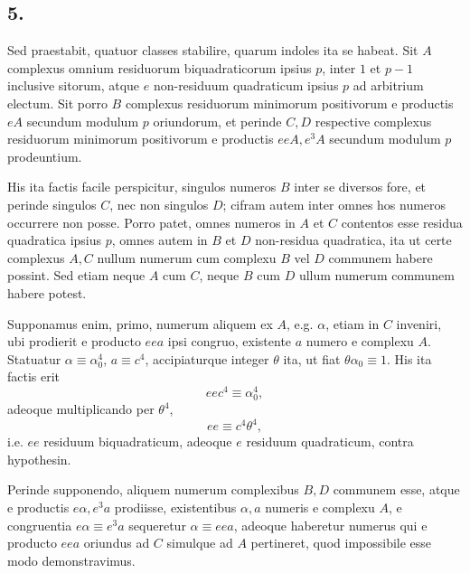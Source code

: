 \documentclass[12pt]{article}
\begin{document}
\subsection*{5.}

Sed praestabit, quatuor classes stabilire, quarum indoles ita se habeat. Sit $A$ complexus omnium residuorum biquadraticorum ipsius $p$, inter $1$ et $p-1$ inclusive sitorum, atque $e$ non-residuum quadraticum ipsius $p$ ad arbitrium electum. Sit porro $B$ complexus residuorum minimorum positivorum e productis $eA$ secundum modulum $p$ oriundorum, et perinde $C,D$ respective complexus residuorum minimorum positivorum e productis $eeA,e^3A$ secundum modulum $p$ prodeuntium.

His ita factis facile perspicitur, singulos numeros $B$ inter se diversos fore, et perinde singulos $C$, nec non singulos $D$; cifram autem inter omnes hos numeros occurrere non posse. Porro patet, omnes numeros in $A$ et $C$ contentos esse residua quadratica ipsius $p$, omnes autem in $B$ et $D$ non-residua quadratica, ita ut certe complexus $A,C$ nullum numerum cum complexu $B$ vel $D$ communem habere possint. Sed etiam neque $A$ cum $C$, neque $B$ cum $D$ ullum numerum communem habere potest.

Supponamus enim, primo, numerum aliquem ex $A$, e.g. $\alpha$, etiam in $C$ inveniri, ubi prodierit e producto $eea$ ipsi congruo, existente $a$ numero e complexu $A$. Statuatur $\alpha\equiv \alpha_0^4$, $a\equiv c^4$, accipiaturque integer $\theta$ ita, ut fiat $\theta\alpha_0\equiv1$. His ita factis erit
\[
ee c^4\equiv \alpha_0^4,
\]
adeoque multiplicando per $\theta^4$,
\[
ee\equiv c^4\theta^4,
\]
i.e. $ee$ residuum biquadraticum, adeoque $e$ residuum quadraticum, contra hypothesin.

Perinde supponendo, aliquem numerum complexibus $B,D$ communem esse, atque e productis $e\alpha,e^3a$ prodiisse, existentibus $\alpha,a$ numeris e complexu $A$, e congruentia $e\alpha\equiv e^3a$ sequeretur $\alpha\equiv eea$, adeoque haberetur numerus qui e producto $eea$ oriundus ad $C$ simulque ad $A$ pertineret, quod impossibile esse modo demonstravimus.
\end{document}
